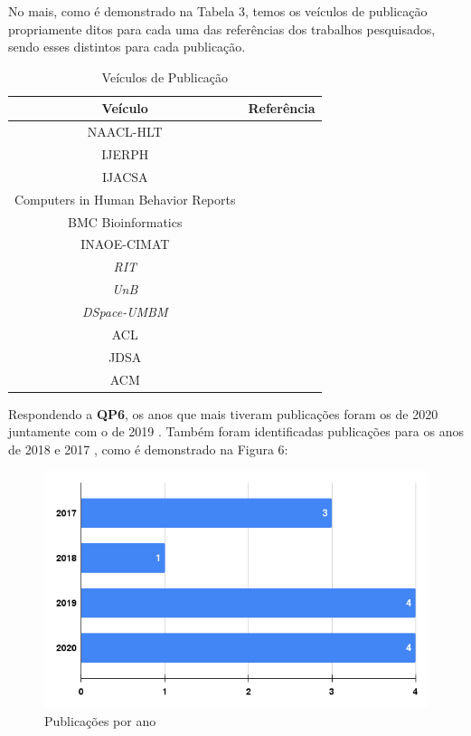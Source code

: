 \documentclass[conference]{IEEEtran}
\begin{document}
No mais, como é demonstrado na Tabela 3, temos os veículos de publicação propriamente ditos para cada uma das referências dos trabalhos pesquisados, sendo esses distintos para cada publicação.

\begin{table}[h]
    \centering
    \caption{Veículos de Publicação}
    \begin{tabular}[t]{c|c}
         \hline
         \textbf{Veículo} & \textbf{Referência} \\
         \hline
         NAACL-HLT & \cite{ArtigoN1} \\
         IJERPH & \cite{ArtigoN2} \\
         IJACSA & \cite{ArtigoN3} \\
         Computers in Human Behavior Reports & \cite{ArtigoN4} \\
         BMC Bioinformatics & \cite{ArtigoN5} \\
         INAOE-CIMAT & \cite{ArtigoN6} \\
         \textit{RIT} & \cite{ArtigoN7} \\
         \textit{UnB} & \cite{ArtigoN8} \\
         \textit{DSpace-UMBM} & \cite{ArtigoN9} \\
         ACL & \cite{ArtigoN10} \\
         JDSA & \cite{ArtigoN11} \\
         ACM & \cite{ArtigoN12}
    \end{tabular}
    \label{tab:veiculos_publicacoes}
\end{table}

Respondendo a \textbf{QP6}, os anos que mais tiveram publicações foram os de 2020 \cite{ArtigoN2, ArtigoN4, ArtigoN6, ArtigoN10} juntamente com o de 2019 \cite{ArtigoN1, ArtigoN3, ArtigoN7, ArtigoN8}. Também foram identificadas publicações para os anos de 2018 \cite{ArtigoN5} e 2017 \cite{ArtigoN9, ArtigoN11, ArtigoN12}, como é demonstrado na Figura 6:

\begin{figure}[h]
    \centering
    \includegraphics[scale=0.4]{images/quantitativo-publicacoes-por-ano.png}
    \caption{Publicações por ano}
    \label{fig:quantitativo-publicacoes-por-ano}
\end{figure}
\end{document}
